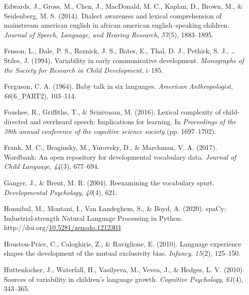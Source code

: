 \documentclass[10pt, letterpaper]{article}
\newenvironment{CSLReferences}%
  {}%
  {\par}
\begin{document}
\begin{CSLReferences}{1}{0}
\leavevmode\hypertarget{ref-edwards2014dialect}{}%
Edwards, J., Gross, M., Chen, J., MacDonald, M. C., Kaplan, D., Brown,
M., \& Seidenberg, M. S. (2014). Dialect awareness and lexical
comprehension of mainstream american english in african american
english--speaking children. \emph{Journal of Speech, Language, and
Hearing Research}, \emph{57}(5), 1883--1895.

\leavevmode\hypertarget{ref-fenson1994variability}{}%
Fenson, L., Dale, P. S., Reznick, J. S., Bates, E., Thal, D. J.,
Pethick, S. J., \ldots{} Stiles, J. (1994). Variability in early
communicative development. \emph{Monographs of the Society for Research
in Child Development}, i--185.

\leavevmode\hypertarget{ref-ferguson1964baby}{}%
Ferguson, C. A. (1964). Baby talk in six languages. \emph{American
Anthropologist}, \emph{66}(6\_PART2), 103--114.

\leavevmode\hypertarget{ref-foushee2016lexical}{}%
Foushee, R., Griffiths, T., \& Srinivasan, M. (2016). Lexical complexity
of child-directed and overheard speech: Implications for learning. In
\emph{Proceedings of the 38th annual conference of the cognitive science
society} (pp. 1697--1702).

\leavevmode\hypertarget{ref-frank2017wordbank}{}%
Frank, M. C., Braginsky, M., Yurovsky, D., \& Marchman, V. A. (2017).
Wordbank: An open repository for developmental vocabulary data.
\emph{Journal of Child Language}, \emph{44}(3), 677--694.

\leavevmode\hypertarget{ref-ganger2004reexamining}{}%
Ganger, J., \& Brent, M. R. (2004). Reexamining the vocabulary spurt.
\emph{Developmental Psychology}, \emph{40}(4), 621.

\leavevmode\hypertarget{ref-honnibal2020spacy}{}%
Honnibal, M., Montani, I., Van Landeghem, S., \& Boyd, A. (2020).
{spaCy: Industrial-strength Natural Language Processing in Python}.
http://doi.org/\href{https://doi.org/10.5281/zenodo.1212303}{10.5281/zenodo.1212303}

\leavevmode\hypertarget{ref-houston2010language}{}%
Houston-Price, C., Caloghiris, Z., \& Raviglione, E. (2010). Language
experience shapes the development of the mutual exclusivity bias.
\emph{Infancy}, \emph{15}(2), 125--150.

\leavevmode\hypertarget{ref-huttenlocher2010sources}{}%
Huttenlocher, J., Waterfall, H., Vasilyeva, M., Vevea, J., \& Hedges, L.
V. (2010). Sources of variability in children's language growth.
\emph{Cognitive Psychology}, \emph{61}(4), 343--365.


\end{CSLReferences}
\end{document}
